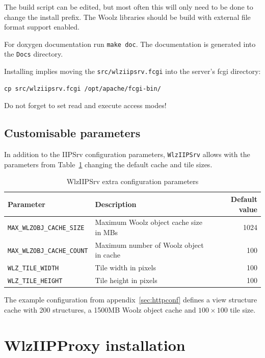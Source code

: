 \documentclass[11pt]{article}
\begin{document}
The build script can be edited, but most often this will only
need to be done to change the install prefix.
The Woolz libraries should be build with external file format support
enabled.

For doxygen documentation run \texttt{make doc}.
The documentation is generated into the \texttt{Docs} directory.

Installing implies moving the \texttt{src/wlziipsrv.fcgi} into the server's
fcgi directory:
\begin{verbatim}
cp src/wlziipsrv.fcgi /opt/apache/fcgi-bin/
\end{verbatim}
Do not forget to set read and execute access modes!

\subsection{Customisable parameters}
\label{sec:custom_param}
In addition to the IIPSrv \cite[p.25]{IIPSRV097} configuration parameters, \texttt{WlzIIPSrv} allows with the  parameters from Table~\ref{tab:parameters} changing the default cache and tile sizes.

\begin{table}[!htbp]
\centering
\begin{tabular}{|l|p{}|r|}
\hline
\textbf{Parameter}          & \textbf{Description}                        & \textbf{Default value} \\
\hline
\texttt{MAX\_WLZOBJ\_CACHE\_SIZE}        & Maximum Woolz object cache size in MBs               & 1024 \\
\texttt{MAX\_WLZOBJ\_CACHE\_COUNT}	 & Maximum number of Woolz object in cache		& 100 \\
\texttt{WLZ\_TILE\_WIDTH}                & Tile width in pixels                                 & 100  \\
\texttt{WLZ\_TILE\_HEIGHT}               & Tile height in pixels                                & 100  \\
\hline
\end{tabular}
\caption{WlzIIPSrv extra configuration parameters}
\label{tab:parameters}
\end{table}

The example configuration from appendix~\ref{sec:httpconf} defines a view
structure cache with 200 structures, a 1500MB Woolz object cache
and $100\times100$ tile size.

\section{WlzIIPProxy installation}
\label{sec:fcgi:install}
\end{document}
